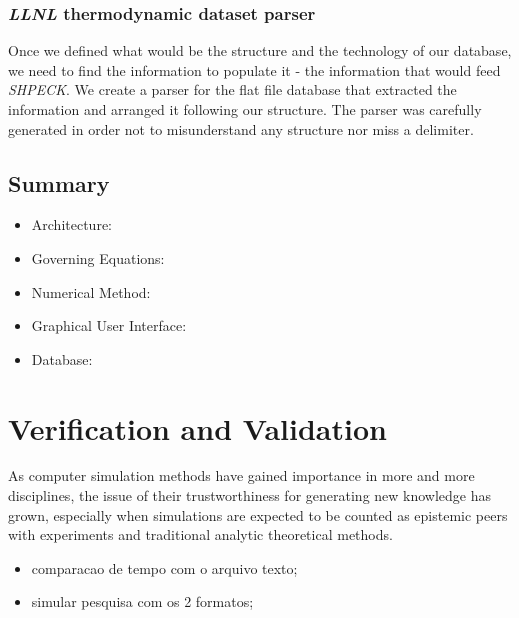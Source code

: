 \documentclass[ppgc,mestrado,english]{iiufrgs}
\begin{document}
\subsection{\emph{LLNL} thermodynamic dataset parser}
Once we defined what would be the structure and the technology of our database, we need to find the information to populate it - the information that would  feed \emph{SHPECK}. We create a parser for the flat file database that extracted the information and arranged it following our structure. The parser was carefully generated in order not to misunderstand any structure nor miss a delimiter.

\newpage


\section{Summary}
\begin{itemize}
\item Architecture:
\item Governing Equations:
\item Numerical Method:
\item Graphical User Interface:
\item Database: 
\end{itemize}


\chapter{Verification and Validation}

As computer simulation methods have gained importance in more and more disciplines, the issue of their trustworthiness for generating new knowledge has grown, especially when simulations are expected to be counted as epistemic peers with experiments and traditional analytic theoretical methods.

\begin{itemize}
\item comparacao de tempo com o arquivo texto; 
\item simular pesquisa com os 2 formatos;
\end{itemize}

 
\end{document}
